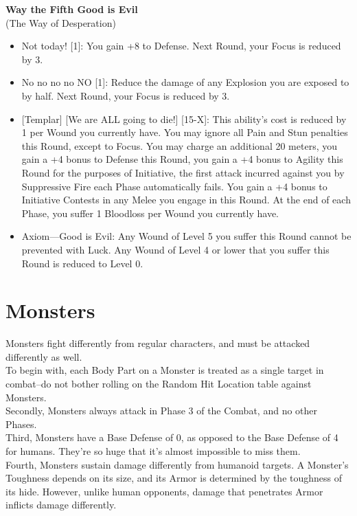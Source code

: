 \documentclass[a4paper, twocolumn, openany]{book}
\begin{document}
{{\bfseries Way the Fifth Good is Evil\\}
(The Way of Desperation)\\
\begin{itemize}
\item Not today! [1]: You gain +8 to Defense. Next Round, your Focus is reduced by 3.
\item No no no no NO [1]: Reduce the damage of any Explosion you are exposed to by half.
Next Round, your Focus is reduced by 3.
\item {[}Templar{]} [We are ALL going to die!] [15-X]: This ability's cost is reduced by 1 per
Wound you currently have. You may ignore all Pain and Stun penalties this Round,
except to Focus. You may charge an additional 20 meters, you gain a +4 bonus to
Defense this Round, you gain a +4 bonus to Agility this Round for the purposes of
Initiative, the first attack incurred against you by Suppressive Fire each Phase
automatically fails. You gain a +4 bonus to Initiative Contests in any Melee you engage
in this Round. At the end of each Phase, you suffer 1 Bloodloss per Wound you currently
have.
\item Axiom—Good is Evil: Any Wound of Level 5 you suffer this Round cannot be prevented
with Luck. Any Wound of Level 4 or lower that you suffer this Round is reduced to Level
0.\\[\baselineskip]
\end{itemize}

\chapter{Monsters}

Monsters fight differently from regular characters, and must be attacked differently as well.\\

To begin with, each Body Part on a Monster is treated as a single target in combat--do not
bother rolling on the Random Hit Location table against Monsters.\\

Secondly, Monsters always attack in Phase 3 of the Combat, and no other Phases.\\

Third, Monsters have a Base Defense of 0, as opposed to the Base Defense of 4 for humans.
They’re so huge that it’s almost impossible to miss them.\\

Fourth, Monsters sustain damage differently from humanoid targets. A Monster’s Toughness
depends on its size, and its Armor is determined by the toughness of its hide. However, unlike
human opponents, damage that penetrates Armor inflicts damage differently.\\

}
\end{document}
